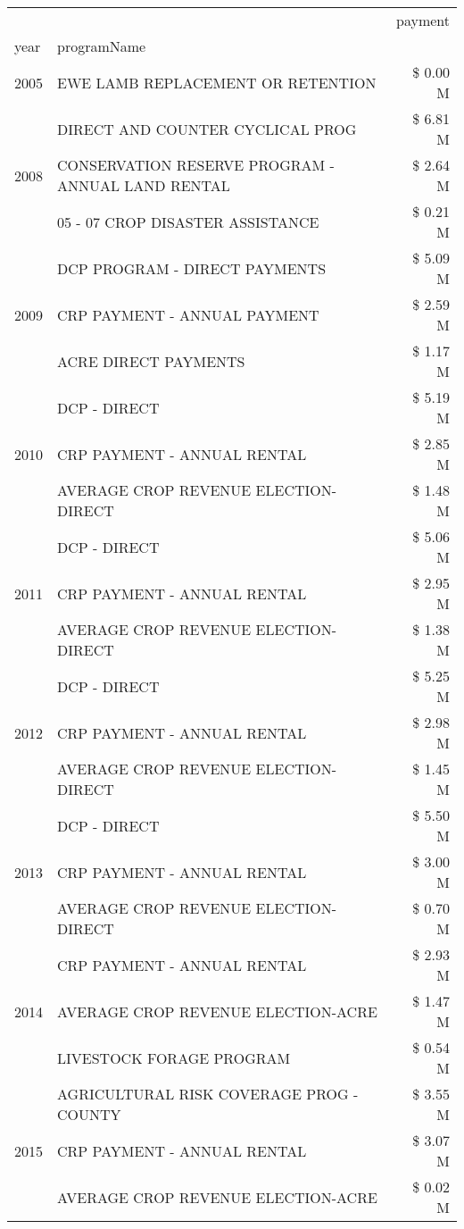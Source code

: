 \begin{tabular}{llr}
\toprule
 &  & payment \\
year & programName &  \\
\midrule
2005 & EWE LAMB REPLACEMENT OR RETENTION & \$ 0.00 M \\
\cline{1-3}
\multirow[t]{3}{*}{2008} & DIRECT AND COUNTER CYCLICAL PROG & \$ 6.81 M \\
 & CONSERVATION RESERVE PROGRAM - ANNUAL LAND RENTAL & \$ 2.64 M \\
 & 05 - 07 CROP DISASTER ASSISTANCE & \$ 0.21 M \\
\cline{1-3}
\multirow[t]{3}{*}{2009} & DCP PROGRAM - DIRECT PAYMENTS & \$ 5.09 M \\
 & CRP PAYMENT - ANNUAL PAYMENT & \$ 2.59 M \\
 & ACRE DIRECT PAYMENTS & \$ 1.17 M \\
\cline{1-3}
\multirow[t]{3}{*}{2010} & DCP - DIRECT & \$ 5.19 M \\
 & CRP PAYMENT - ANNUAL RENTAL & \$ 2.85 M \\
 & AVERAGE CROP REVENUE ELECTION-DIRECT & \$ 1.48 M \\
\cline{1-3}
\multirow[t]{3}{*}{2011} & DCP - DIRECT & \$ 5.06 M \\
 & CRP PAYMENT - ANNUAL RENTAL & \$ 2.95 M \\
 & AVERAGE CROP REVENUE ELECTION-DIRECT & \$ 1.38 M \\
\cline{1-3}
\multirow[t]{3}{*}{2012} & DCP - DIRECT & \$ 5.25 M \\
 & CRP PAYMENT - ANNUAL RENTAL & \$ 2.98 M \\
 & AVERAGE CROP REVENUE ELECTION-DIRECT & \$ 1.45 M \\
\cline{1-3}
\multirow[t]{3}{*}{2013} & DCP - DIRECT & \$ 5.50 M \\
 & CRP PAYMENT - ANNUAL RENTAL & \$ 3.00 M \\
 & AVERAGE CROP REVENUE ELECTION-DIRECT & \$ 0.70 M \\
\cline{1-3}
\multirow[t]{3}{*}{2014} & CRP PAYMENT - ANNUAL RENTAL & \$ 2.93 M \\
 & AVERAGE CROP REVENUE ELECTION-ACRE & \$ 1.47 M \\
 & LIVESTOCK FORAGE PROGRAM & \$ 0.54 M \\
\cline{1-3}
\multirow[t]{3}{*}{2015} & AGRICULTURAL RISK COVERAGE PROG - COUNTY & \$ 3.55 M \\
 & CRP PAYMENT - ANNUAL RENTAL & \$ 3.07 M \\
 & AVERAGE CROP REVENUE ELECTION-ACRE & \$ 0.02 M \\

\end{tabular}

